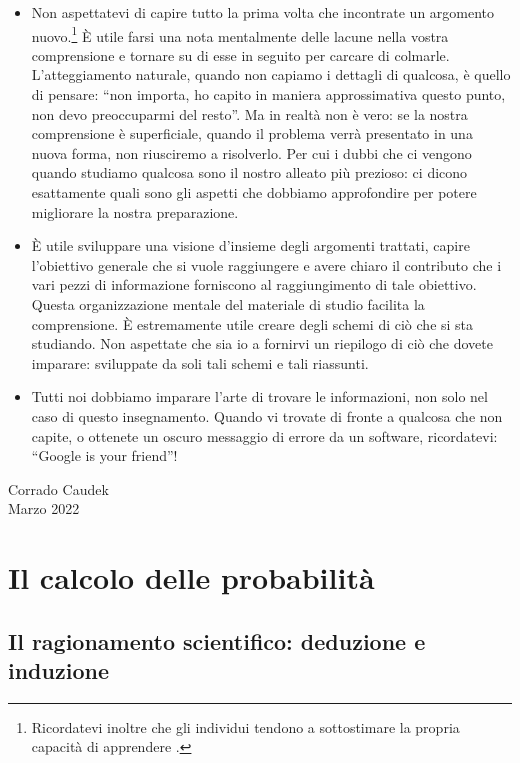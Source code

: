 \documentclass[
  11pt,
]{krantz}
\theoremstyle{definition}
\theoremstyle{definition}
\theoremstyle{definition}
\theoremstyle{definition}
\theoremstyle{remark}
\begin{document}
\begin{itemize}
\item
  Non aspettatevi di capire tutto la prima volta che incontrate un argomento nuovo.\footnote{Ricordatevi inoltre che gli individui tendono a sottostimare la propria capacità di apprendere \citep{horn2021underestimating}.} È utile farsi una nota mentalmente delle lacune nella vostra comprensione e tornare su di esse in seguito per carcare di colmarle. L'atteggiamento naturale, quando non capiamo i dettagli di qualcosa, è quello di pensare: ``non importa, ho capito in maniera approssimativa questo punto, non devo preoccuparmi del resto''. Ma in realtà non è vero: se la nostra comprensione è superficiale, quando il problema verrà presentato in una nuova forma, non riusciremo a risolverlo. Per cui i dubbi che ci vengono quando studiamo qualcosa sono il nostro alleato più prezioso: ci dicono esattamente quali sono gli aspetti che dobbiamo approfondire per potere migliorare la nostra preparazione.
\item
  È utile sviluppare una visione d'insieme degli argomenti trattati, capire l'obiettivo generale che si vuole raggiungere e avere chiaro il contributo che i vari pezzi di informazione forniscono al raggiungimento di tale obiettivo. Questa organizzazione mentale del materiale di studio facilita la comprensione. È estremamente utile creare degli schemi di ciò che si sta studiando. Non aspettate che sia io a fornirvi un riepilogo di ciò che dovete imparare: sviluppate da soli tali schemi e tali riassunti.
\item
  Tutti noi dobbiamo imparare l'arte di trovare le informazioni, non solo nel caso di questo insegnamento. Quando vi trovate di fronte a qualcosa che non capite, o ottenete un oscuro messaggio di errore da un software, ricordatevi: ``Google is your friend''!
\end{itemize}

\begin{flushright}
Corrado Caudek\\
Marzo 2022 \end{flushright}

\mainmatter

\hypertarget{part-il-calcolo-delle-probabilituxe0}{%
\part{Il calcolo delle probabilità}\label{part-il-calcolo-delle-probabilituxe0}}

\hypertarget{intro-prob-1}{%
\chapter{Il ragionamento scientifico: deduzione e induzione}\label{intro-prob-1}}
\end{document}
